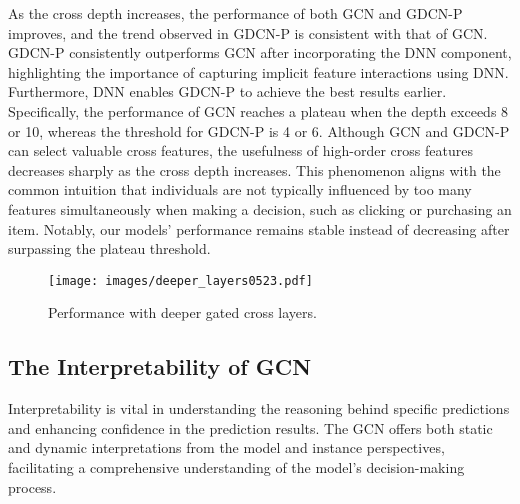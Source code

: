 \documentclass[sigconf]{acmart}
\begin{document}
As the cross depth increases, the performance of both GCN and GDCN-P improves, and the trend observed in GDCN-P is consistent with that of GCN. GDCN-P consistently outperforms GCN after incorporating the DNN component, highlighting the importance of capturing implicit feature interactions using DNN. Furthermore, DNN enables GDCN-P to achieve the best results earlier. Specifically, the performance of GCN reaches a plateau when the depth exceeds 8 or 10, whereas the threshold for GDCN-P is 4 or 6. Although GCN and GDCN-P can select valuable cross features, the usefulness of high-order cross features decreases sharply as the cross depth increases. This phenomenon aligns with the common intuition that individuals are not typically influenced by too many features simultaneously when making a decision, such as clicking or purchasing an item. Notably, our models' performance remains stable instead of decreasing after surpassing the plateau threshold.

\begin{figure}[t]
\setlength{\abovecaptionskip}{0.2cm}
\setlength{\belowcaptionskip}{-0.2cm}
\centering
\texttt{[image: images/deeper\_layers0523.pdf]}
\caption{Performance with deeper gated cross layers.} 
\label{fig:deeper_layers}
\end{figure}



\subsection{The Interpretability of GCN}

Interpretability is vital in understanding the reasoning behind specific predictions and enhancing confidence in the prediction results. The GCN offers both static and dynamic interpretations from the model and instance perspectives, facilitating a comprehensive understanding of the model's decision-making process.
 
\end{document}
